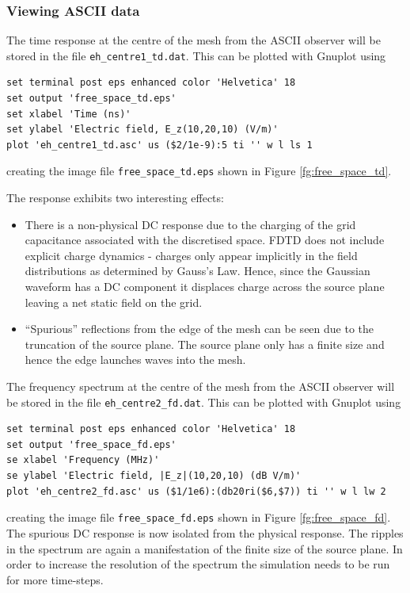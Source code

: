 \documentclass[onecolumn,a4paper]{article}
\numberwithin{equation}{section}
\begin{document}
\subsubsection{Viewing ASCII data}

The time response at the centre of the mesh from the ASCII observer will be
stored in the file \texttt{eh\_centre1\_td.dat}. This can be plotted with Gnuplot
using
\begin{verbatim}
set terminal post eps enhanced color 'Helvetica' 18
set output 'free_space_td.eps'
set xlabel 'Time (ns)'
set ylabel 'Electric field, E_z(10,20,10) (V/m)'
plot 'eh_centre1_td.asc' us ($2/1e-9):5 ti '' w l ls 1
\end{verbatim}
creating the image file \texttt{free\_space\_td.eps} shown in Figure \ref{fg:free_space_td}.

The response exhibits two interesting effects:
\begin{itemize}
 \item There is a non-physical DC response due to the charging of the grid capacitance associated
 with the discretised space. FDTD does not include explicit charge dynamics - charges only appear implicitly
 in the field distributions as determined by Gauss's Law. Hence,  since the Gaussian waveform has a DC component it displaces
 charge across the source plane leaving a net static field on the grid.  
 \item ``Spurious'' reflections from the edge of the mesh can be seen due to the truncation
 of the source plane. The source plane only has a finite size and hence the edge launches waves
 into the mesh.
\end{itemize}

The frequency spectrum at the centre of the mesh from the ASCII observer will be
stored in the file \texttt{eh\_centre2\_fd.dat}. This can be plotted with Gnuplot
using
\begin{verbatim}
set terminal post eps enhanced color 'Helvetica' 18
set output 'free_space_fd.eps'
se xlabel 'Frequency (MHz)'
se ylabel 'Electric field, |E_z|(10,20,10) (dB V/m)'
plot 'eh_centre2_fd.asc' us ($1/1e6):(db20ri($6,$7)) ti '' w l lw 2
\end{verbatim}
creating the image file \texttt{free\_space\_fd.eps} shown in Figure \ref{fg:free_space_fd}.
The spurious DC response is
now isolated from the physical response. The ripples in the spectrum are
again a manifestation of the finite size of the source plane. In order to
increase the resolution of the spectrum the simulation needs to be run for
more time-steps.
\end{document}
